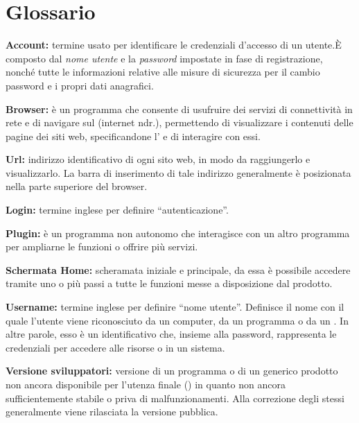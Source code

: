 \section{Glossario}
\begin{description}
\item\textbf{Account:} termine usato per identificare le credenziali d'accesso di un utente.È composto dal \textit{nome utente} e la \textit{password} impostate in fase di registrazione, nonché tutte le informazioni relative alle misure di sicurezza per il cambio password e i propri dati anagrafici.
\item\textbf{Browser:} è un programma che consente di usufruire dei servizi di connettività in rete e di navigare sul  (internet ndr.), permettendo di visualizzare i contenuti delle pagine dei siti web, specificandone l' e di interagire con essi.
\item\textbf{Url:} indirizzo identificativo di ogni sito web, in modo da raggiungerlo e visualizzarlo. La barra di inserimento di tale indirizzo generalmente è posizionata nella parte superiore del browser.
\item\textbf{Login:} termine inglese per definire ``autenticazione''.
\item\textbf{Plugin:} è un programma non autonomo che interagisce con un altro programma per ampliarne le funzioni o offrire più servizi.
\item\textbf{Schermata Home:} scheramata iniziale e principale, da essa è possibile accedere tramite uno o più passi a tutte le funzioni messe a disposizione dal prodotto.
\item\textbf{Username:} termine inglese per definire ``nome utente''. Definisce il nome con il quale l'utente viene riconosciuto da un computer, da un programma o da un . In altre parole, esso è un identificativo che, insieme alla password, rappresenta le credenziali per accedere alle risorse o in un sistema.
\item\textbf{Versione sviluppatori:} versione di un programma o di un generico prodotto non ancora disponibile per l'utenza finale () in quanto non ancora sufficientemente  stabile o priva di malfunzionamenti. Alla correzione degli stessi generalmente viene rilasciata la versione pubblica.
\end{description}


